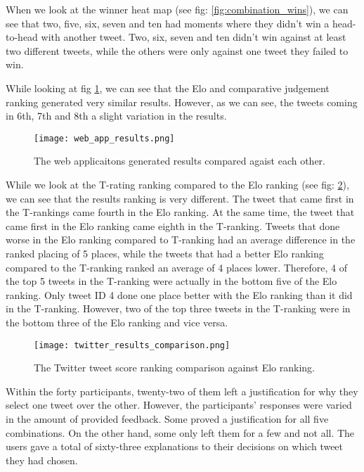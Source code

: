 	When we look at the winner heat map (see fig: \ref{fig:combination_wins}), we can see that two, five, six, seven and ten had moments where they didn't win a head-to-head with another tweet. Two, six, seven and ten didn't win against at least two different tweets, while the others were only against one tweet they failed to win.
	
	
	While looking at fig \ref{fig:web_app_results}, we can see that the Elo and comparative judgement ranking generated very similar results. However, as we can see, the tweets coming in 6th, 7th and 8th a slight variation in the results.
	
	\begin{figure}[h]
		\centering
		\texttt{[image: web\_app\_results.png]}
		\caption{The web applicaitons generated results compared agaist each other.}
		\label{fig:web_app_results}
		
	\end{figure}

	While we look at the T-rating ranking compared to the Elo ranking (see fig: \ref{fig:twitter_results_comparison}), we can see that the results ranking is very different. The tweet that came first in the T-rankings came fourth in the Elo ranking. At the same time, the tweet that came first in the Elo ranking came eighth in the T-ranking.  Tweets that done worse in the Elo ranking compared to T-ranking had an average difference in the ranked placing of 5 places, while the tweets that had a better Elo ranking compared to the T-ranking ranked an average of 4 places lower. Therefore, 4 of the top 5 tweets in the T-ranking were actually in the bottom five of the Elo ranking. Only tweet ID 4 done one place better with the Elo ranking than it did in the T-ranking. However, two of the top three tweets in the T-ranking were in the bottom three of the Elo ranking and vice versa.

	\begin{figure}[h]
		\centering
		\texttt{[image: twitter\_results\_comparison.png]}
		\caption{The Twitter tweet score ranking comparison against Elo ranking.}
		\label{fig:twitter_results_comparison}
		
	\end{figure}

	Within the forty participants, twenty-two of them left a justification for why they select one tweet over the other. However, the participants' responses were varied in the amount of provided feedback. Some proved a justification for all five combinations. On the other hand, some only left them for a few and not all. The users gave a total of sixty-three explanations to their decisions on which tweet they had chosen.
	
